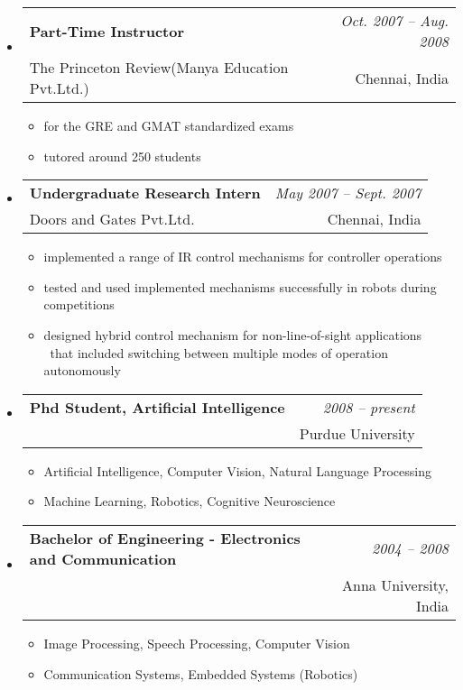 \documentclass[10pt]{article}
\makeatletter
\newenvironment{position}[4]
{\filbreak
\item
  \begin{tabular*}{6.5in}{l@{\extracolsep{\fill}}r}
    \textbf{#1} & \textit{#2} \\ #3 & \footnotesize{#4} \\
  \end{tabular*}
  \begin{itemize} \setlength{\parskip}{-1pt}}
  { \end{itemize} }
\newenvironment{region}[1] {{\large \textbf{#1}} \begin{itemize}} {\end{itemize}}
\makeatother
\begin{document}
\begin{region} {Experience}
\begin{position} {Part-Time Instructor}
    {Oct. 2007 -- Aug. 2008}
    {The Princeton Review(Manya Education Pvt.Ltd.)}
    {Chennai, India}
  \item for the GRE and GMAT standardized exams
  \item tutored around 250 students
  \end{position}
  \begin{position} {Undergraduate Research Intern}
    {May 2007 -- Sept. 2007}
    {Doors and Gates Pvt.Ltd.}
    {Chennai, India}
  \item implemented a range of IR control mechanisms for controller operations
  \item tested and used implemented mechanisms successfully in robots during competitions
  \item designed hybrid control mechanism for non-line-of-sight applications\\
    \  that included switching between multiple modes of operation autonomously
  \end{position}
\end{region}

\newpage
\begin{region} {Education}
  \begin{position}{Phd Student, Artificial Intelligence}
    {2008 -- present}
    {}
    {Purdue University}
    \vspace{-0.2in}
  \item Artificial Intelligence, Computer Vision, Natural Language Processing
  \item Machine Learning, Robotics, Cognitive Neuroscience
  \end{position}
  \begin{position} {Bachelor of Engineering - Electronics and Communication}
    {2004 -- 2008}
    {}
    {Anna University, India}
    \vspace{-0.2in}
  \item Image Processing, Speech Processing, Computer Vision
  \item Communication Systems, Embedded Systems (Robotics)
  \end{position}
\end{region}
\end{document}
